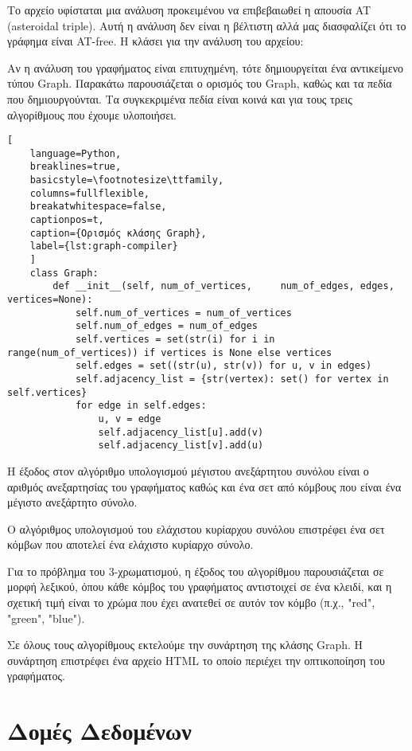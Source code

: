 Το αρχείο υφίσταται μια ανάλυση προκειμένου να επιβεβαιωθεί η απουσία AT (asteroidal triple). Αυτή η ανάλυση δεν είναι η βέλτιστη αλλά μας διασφαλίζει ότι το γράφημα είναι AT-free. Η κλάσει για την ανάλυση του αρχείου:





Αν η ανάλυση του γραφήματος είναι επιτυχημένη, τότε δημιουργείται ένα αντικείμενο τύπου Graph. Παρακάτω παρουσιάζεται ο ορισμός του Graph, καθώς και τα πεδία που δημιουργούνται. Τα συγκεκριμένα πεδία είναι κοινά και για τους τρεις αλγορίθμους που έχουμε υλοποιήσει. 

  

\begin{lstlisting}[
	language=Python,
	breaklines=true,
	basicstyle=\footnotesize\ttfamily,
	columns=fullflexible,
	breakatwhitespace=false,
	captionpos=t,
	caption={Ορισμός κλάσης Graph},
	label={lst:graph-compiler}
	]
	class Graph:
		def __init__(self, num_of_vertices, 	num_of_edges, edges, vertices=None):
			self.num_of_vertices = num_of_vertices
			self.num_of_edges = num_of_edges
			self.vertices = set(str(i) for i in range(num_of_vertices)) if vertices is None else vertices
			self.edges = set((str(u), str(v)) for u, v in edges)
			self.adjacency_list = {str(vertex): set() for vertex in self.vertices}
			for edge in self.edges:
				u, v = edge
				self.adjacency_list[u].add(v)
				self.adjacency_list[v].add(u)
\end{lstlisting}


Η έξοδος στον αλγόριθμο υπολογισμού μέγιστου ανεξάρτητου συνόλου
είναι ο αριθμός ανεξαρτησίας του γραφήματος καθώς και ένα σετ από κόμβους που είναι ένα μέγιστο ανεξάρτητο σύνολο. 


Ο αλγόριθμος υπολογισμού του ελάχιστου κυρίαρχου συνόλου επιστρέφει ένα σετ κόμβων που αποτελεί ένα ελάχιστο κυρίαρχο σύνολο.  

Για το πρόβλημα του 3-χρωματισμού, η έξοδος του αλγορίθμου παρουσιάζεται σε μορφή λεξικού, όπου κάθε κόμβος του γραφήματος αντιστοιχεί σε ένα κλειδί, και η σχετική τιμή είναι το χρώμα που έχει ανατεθεί σε αυτόν τον κόμβο (π.χ., "red", "green", "blue").

Σε όλους τους αλγορίθμους εκτελούμε την συνάρτηση  της κλάσης Graph. Η συνάρτηση επιστρέφει ένα αρχείο HTML το οποίο περιέχει την οπτικοποίηση του γραφήματος.

\section{Δομές Δεδομένων}


